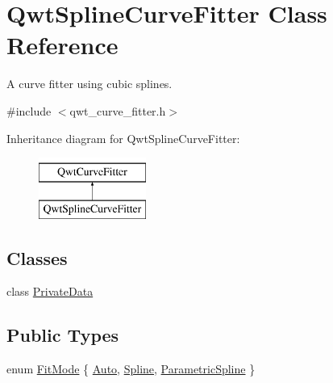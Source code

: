 \hypertarget{class_qwt_spline_curve_fitter}{\section{Qwt\-Spline\-Curve\-Fitter Class Reference}
\label{class_qwt_spline_curve_fitter}
}


A curve fitter using cubic splines.  




{\ttfamily \#include $<$qwt\-\_\-curve\-\_\-fitter.\-h$>$}

Inheritance diagram for Qwt\-Spline\-Curve\-Fitter\-:\begin{figure}[H]
\begin{center}
\leavevmode
\includegraphics[height=2.000000cm]{class_qwt_spline_curve_fitter}
\end{center}
\end{figure}
\subsection*{Classes}
\begin{DoxyCompactItemize}
\item 
class \hyperlink{class_qwt_spline_curve_fitter_1_1_private_data}{Private\-Data}
\end{DoxyCompactItemize}
\subsection*{Public Types}
\begin{DoxyCompactItemize}
\item 
enum \hyperlink{class_qwt_spline_curve_fitter_a8c5e6858f885b5691c30092a950879a8}{Fit\-Mode} \{ \hyperlink{class_qwt_spline_curve_fitter_a8c5e6858f885b5691c30092a950879a8ae19b8325da178d410cf10b04ed5a5df6}{Auto}, 
\hyperlink{class_qwt_spline_curve_fitter_a8c5e6858f885b5691c30092a950879a8a97f3e821b70470f056b60a883229ec13}{Spline}, 
\hyperlink{class_qwt_spline_curve_fitter_a8c5e6858f885b5691c30092a950879a8a877f71e694ae9a2e33533a3fb5065c66}{Parametric\-Spline}
 \}
\end{DoxyCompactItemize}
